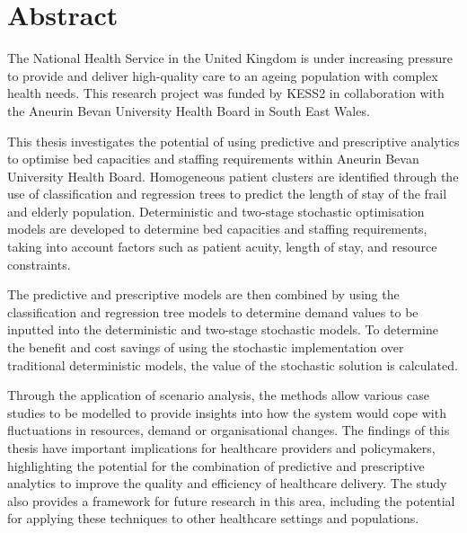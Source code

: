 \documentclass[thesis.tex]{subfiles}
\begin{document}
\chapter*{Abstract}
The National Health Service in the United Kingdom is under increasing pressure to provide and deliver high-quality care to an ageing population with complex health needs. This research project was funded by KESS2 in collaboration with the Aneurin Bevan University Health Board in South East Wales.


This thesis investigates the potential of using predictive and prescriptive analytics to optimise bed capacities and staffing requirements within Aneurin Bevan University Health Board. Homogeneous patient clusters are identified through the use of classification and regression trees to predict the length of stay of the frail and elderly population. Deterministic and two-stage stochastic optimisation models are developed to determine bed capacities and staffing requirements, taking into account factors such as patient acuity, length of stay, and resource constraints. 

The predictive and prescriptive models are then combined by using the classification and regression tree models to determine demand values to be inputted into the deterministic and two-stage stochastic models. To determine the benefit and cost savings of using the stochastic implementation over traditional deterministic models, the value of the stochastic solution is calculated.

Through the application of scenario analysis, the methods allow various case studies to be modelled to provide insights into how the system would cope with fluctuations in resources, demand or organisational changes. The findings of this thesis have important implications for healthcare providers and policymakers, highlighting the potential for the combination of predictive and prescriptive analytics to improve the quality and efficiency of healthcare delivery. The study also provides a framework for future research in this area, including the potential for applying these techniques to other healthcare settings and populations.

\end{document}
